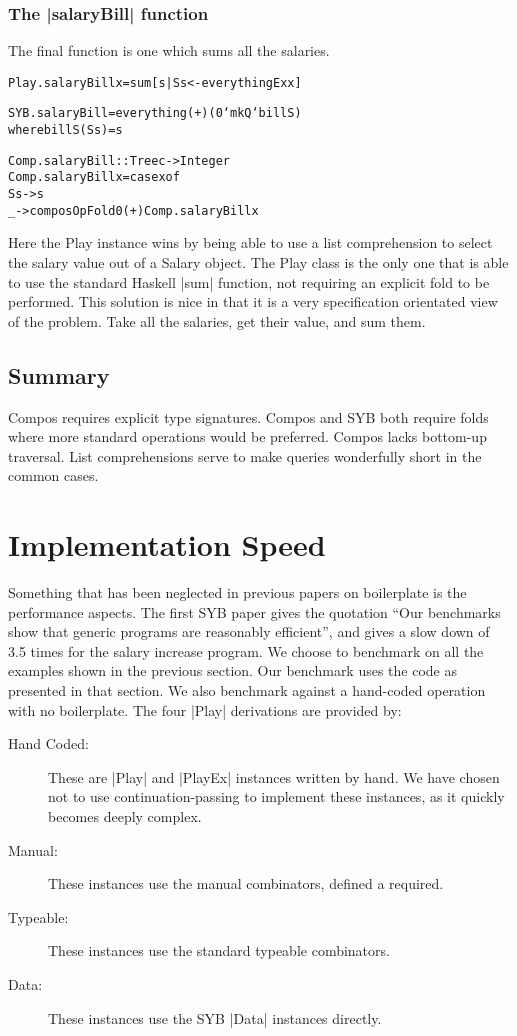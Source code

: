 \documentclass[preprint]{sigplanconf}
\newenvironment{code}{\begin{alltt}\small}{\end{alltt}}
\begin{document}
\subsubsection{The |salaryBill| function}

The final function is one which sums all the salaries.

\begin{code}
Play.salaryBill x = sum [s | S s <- everythingEx x]

SYB.salaryBill = everything (+) (0 `mkQ` billS)
   where billS (S s) = s

Comp.salaryBill :: Tree c -> Integer
Comp.salaryBill x = case x of
    S s -> s
    _ -> composOpFold 0 (+) Comp.salaryBill x
\end{code}

Here the Play instance wins by being able to use a list comprehension to select the salary value out of a Salary object. The Play class is the only one that is able to use the standard Haskell |sum| function, not requiring an explicit fold to be performed. This solution is nice in that it is a very specification orientated view of the problem. Take all the salaries, get their value, and sum them.

\subsection{Summary}

Compos requires explicit type signatures. Compos and SYB both require folds where more standard operations would be preferred. Compos lacks bottom-up traversal. List comprehensions serve to make queries wonderfully short in the common cases.


\section{Implementation Speed}

Something that has been neglected in previous papers on boilerplate is the performance aspects. The first SYB paper gives the quotation ``Our benchmarks show that generic programs are reasonably efficient'', and gives a slow down of 3.5 times for the salary increase program. We choose to benchmark on all the examples shown in the previous section. Our benchmark uses the code as presented in that section. We also benchmark against a hand-coded operation with no boilerplate. The four |Play| derivations are provided by:

\begin{description}
\item[Hand Coded:] These are |Play| and |PlayEx| instances written by hand. We have chosen not to use continuation-passing to implement these instances, as it quickly becomes deeply complex.
\item[Manual:] These instances use the manual combinators, defined a required.
\item[Typeable:] These instances use the standard typeable combinators.
\item[Data:] These instances use the SYB |Data| instances directly.
\end{description}
\end{document}
